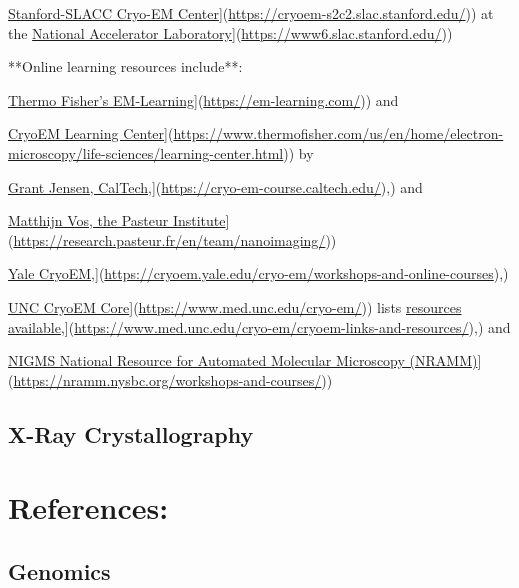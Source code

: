 \documentclass[
]{book}
\begin{document}
\href{\%5Bhttps://cryoem-s2c2.slac.stanford.edu/}{Stanford-SLACC Cryo-EM Center}{]}(\url{https://cryoem-s2c2.slac.stanford.edu/})) at the \href{\%5Bhttps://www6.slac.stanford.edu/}{National Accelerator Laboratory}{]}(\url{https://www6.slac.stanford.edu/}))

**Online learning resources include**:

\href{\%5Bhttps://em-learning.com/}{Thermo Fisher's EM-Learning}{]}(\url{https://em-learning.com/})) and

\href{\%5Bhttps://www.thermofisher.com/us/en/home/electron-microscopy/life-sciences/learning-center.html}{CryoEM Learning Center}{]}(\url{https://www.thermofisher.com/us/en/home/electron-microscopy/life-sciences/learning-center.html})) by

\href{\%5Bhttps://cryo-em-course.caltech.edu/}{Grant Jensen, CalTech},{]}(\url{https://cryo-em-course.caltech.edu/}),) and

\href{\%5Bhttps://research.pasteur.fr/en/team/nanoimaging/}{Matthijn Vos, the Pasteur Institute}{]}(\url{https://research.pasteur.fr/en/team/nanoimaging/}))

\href{\%5Bhttps://cryoem.yale.edu/cryo-em/workshops-and-online-courses}{Yale CryoEM},{]}(\url{https://cryoem.yale.edu/cryo-em/workshops-and-online-courses}),)

\href{\%5Bhttps://www.med.unc.edu/cryo-em/}{UNC CryoEM Core}{]}(\url{https://www.med.unc.edu/cryo-em/})) lists \href{\%5Bhttps://www.med.unc.edu/cryo-em/cryoem-links-and-resources/}{resources available},{]}(\url{https://www.med.unc.edu/cryo-em/cryoem-links-and-resources/}),) and

\href{\%5Bhttps://nramm.nysbc.org/workshops-and-courses/}{NIGMS National Resource for Automated Molecular Microscopy (NRAMM)}{]}(\url{https://nramm.nysbc.org/workshops-and-courses/}))

\section{X-Ray Crystallography}\label{x-ray-crystallography}

\chapter{References:}\label{references}

\section{Genomics}\label{genomics-2}
\end{document}

